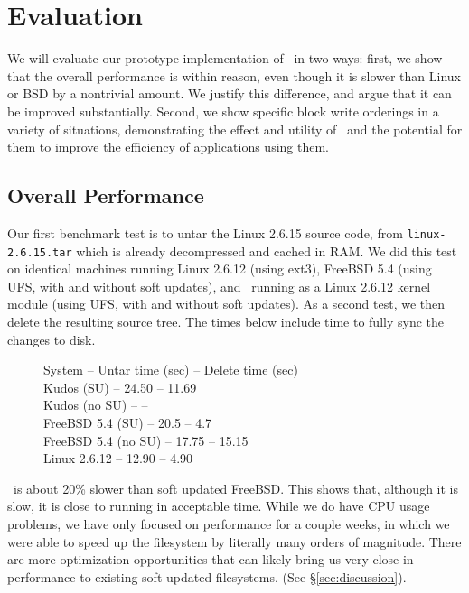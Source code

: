 \section {Evaluation}
\label{sec:evaluation}

We will evaluate our prototype implementation of \Kudos\ in two ways: first, we
show that the overall performance is within reason, even though it is slower
than Linux or BSD by a nontrivial amount. We justify this difference, and argue
that it can be improved substantially. Second, we show specific block write
orderings in a variety of situations, demonstrating the effect and utility of
\opgroups\ and the potential for them to improve the efficiency of applications
using them.

\subsection {Overall Performance}

Our first benchmark test is to untar the Linux 2.6.15 source code, from
\texttt{linux-2.6.15.tar} which is already decompressed and cached in RAM. We
did this test on identical machines running Linux 2.6.12 (using ext3), FreeBSD
5.4 (using UFS, with and without soft updates), and \Kudos\ running as a Linux
2.6.12 kernel module (using UFS, with and without soft updates). As a second
test, we then delete the resulting source tree. The times below include time to
fully sync the changes to disk.

\begin{figure}[htb]
System -- Untar time (sec) -- Delete time (sec) \\
Kudos (SU) -- 24.50 -- 11.69 \\ 
Kudos (no SU) -- -- \\ 
FreeBSD 5.4 (SU) -- 20.5 -- 4.7 \\ 
FreeBSD 5.4 (no SU) -- 17.75 -- 15.15 \\ 
Linux 2.6.12 -- 12.90 -- 4.90 
\end{figure}

\Kudos\ is about 20\% slower than soft updated FreeBSD. This shows
that, although it is slow, it is close to running in acceptable
time. While we do have CPU usage problems, we have only focused on
performance for a couple weeks, in which we were able to speed up the
filesystem by literally many orders of magnitude. There are more
optimization opportunities that can likely bring us very close in
performance to existing soft updated filesystems. (See
\S\ref{sec:discussion}).

